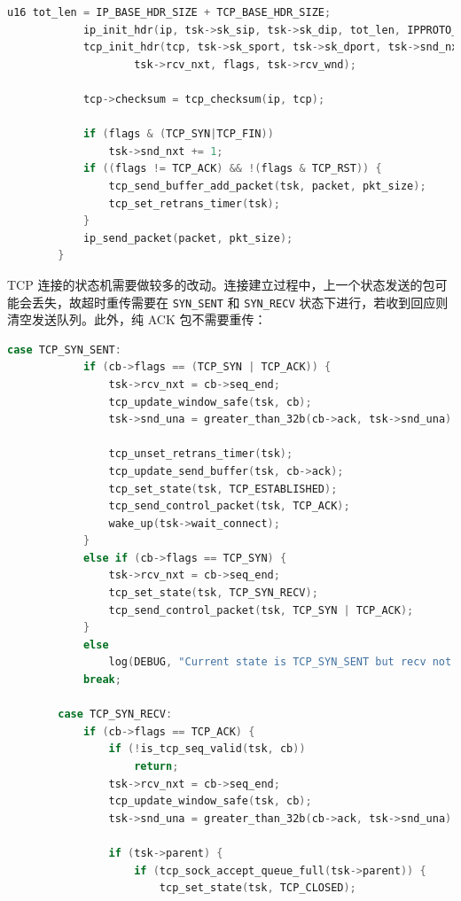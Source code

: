 \documentclass[UTF8]{report}
\begin{document}
\begin{enumerate}
\begin{lstlisting}[language=C]
            u16 tot_len = IP_BASE_HDR_SIZE + TCP_BASE_HDR_SIZE;
            ip_init_hdr(ip, tsk->sk_sip, tsk->sk_dip, tot_len, IPPROTO_TCP);
            tcp_init_hdr(tcp, tsk->sk_sport, tsk->sk_dport, tsk->snd_nxt, \
                    tsk->rcv_nxt, flags, tsk->rcv_wnd);
        
            tcp->checksum = tcp_checksum(ip, tcp);
        
            if (flags & (TCP_SYN|TCP_FIN))
                tsk->snd_nxt += 1;
            if ((flags != TCP_ACK) && !(flags & TCP_RST)) {
                tcp_send_buffer_add_packet(tsk, packet, pkt_size);
                tcp_set_retrans_timer(tsk);
            }
            ip_send_packet(packet, pkt_size);
        }
    \end{lstlisting}
    
    TCP 连接的状态机需要做较多的改动。连接建立过程中，上一个状态发送的包可能会丢失，故超时重传需要在 \texttt{SYN\_SENT} 和 \texttt{SYN\_RECV} 状态下进行，若收到回应则清空发送队列。此外，纯 ACK 包不需要重传：

    \begin{lstlisting}[language=C]
        case TCP_SYN_SENT: 
            if (cb->flags == (TCP_SYN | TCP_ACK)) {
                tsk->rcv_nxt = cb->seq_end;
                tcp_update_window_safe(tsk, cb);
                tsk->snd_una = greater_than_32b(cb->ack, tsk->snd_una) ? cb->ack : tsk->snd_una;;

                tcp_unset_retrans_timer(tsk);
                tcp_update_send_buffer(tsk, cb->ack);
                tcp_set_state(tsk, TCP_ESTABLISHED);
                tcp_send_control_packet(tsk, TCP_ACK);
                wake_up(tsk->wait_connect);
            }
            else if (cb->flags == TCP_SYN) {
                tsk->rcv_nxt = cb->seq_end;
                tcp_set_state(tsk, TCP_SYN_RECV);
                tcp_send_control_packet(tsk, TCP_SYN | TCP_ACK);
            }
            else
                log(DEBUG, "Current state is TCP_SYN_SENT but recv not SYN or SYN|ACK");
            break;
        
        case TCP_SYN_RECV:
            if (cb->flags == TCP_ACK) {
                if (!is_tcp_seq_valid(tsk, cb))
                    return;
                tsk->rcv_nxt = cb->seq_end;
                tcp_update_window_safe(tsk, cb);
                tsk->snd_una = greater_than_32b(cb->ack, tsk->snd_una) ? cb->ack : tsk->snd_una;;

                if (tsk->parent) {
                    if (tcp_sock_accept_queue_full(tsk->parent)) {
                        tcp_set_state(tsk, TCP_CLOSED);


\end{lstlisting}
\end{enumerate}
\end{document}
